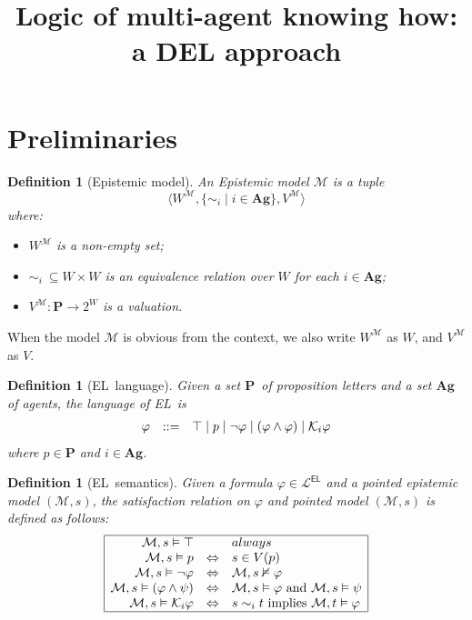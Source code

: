 \documentclass{article}
\title{Logic of multi-agent knowing how: a DEL approach}
\author{}
\date{}
\newtheorem{definition}[theorem]{Definition}
\newcommand{\EL}{\textsf{EL}}
\newcommand{\Act}{\ensuremath{\mathbf{A}}}
\newcommand{\Ag}{\ensuremath{\mathbf{Ag}}}
\newcommand{\BP}{\ensuremath{\mathbf{P}}}
\newcommand{\M}{\mathcal{M}}
\newcommand{\lr}[1]{\langle #1 \rangle}
\newcommand{\K}{\mathcal{K}}
\newcommand{\LanEL}{\ensuremath{\mathcal{L}^\EL}}
\newcommand{\LRA}{\Leftrightarrow}
\renewcommand{\phi}{\varphi}
\begin{document}
\maketitle

\section{Preliminaries}
\begin{definition}[Epistemic model]
	An Epistemic model $\M$ is a tuple $$\lr{W^\M,\{\sim_i\mid i\in \Ag \},V^\M}$$ where:
	\begin{itemize}
		\item $W^\M$ is a non-empty set;
		\item $\sim_i\ \subseteq {W\times W}$ is an equivalence relation over $W$ for each $i\in \Ag$;
		\item $V^\M:\BP\to 2^W$ is a valuation.
	\end{itemize}
\end{definition}
When the model $\M$ is obvious from the context, we also write $W^\M$ as $W$, and $V^\M$ as $V$.
\begin{definition}[\EL\ language]
	Given a set \BP\ of proposition letters and a set $\Ag$ of agents, the language of \EL\ is 
	$$\begin{array}{r@{\quad::= \quad}l}
	\varphi  &
	\top\mid p
	\mid \neg \varphi
	\mid (\varphi \land \varphi)
	\mid \K_i\phi \\
	\end{array}$$
	where $p\in\BP$ %
	and $i\in\Ag$. 
\end{definition}

\begin{definition}[\EL\ semantics]
	Given a formula $\phi\in\LanEL$ and a pointed epistemic model $(\M,s)$, %
	the satisfaction relation on $\phi$ and pointed model $(\M,s)$ is defined as follows:
	$$\begin{array}{|rll|}
	\hline
	\M,s\vDash \top &  & always\\
	\M,s\vDash p & \Leftrightarrow & s\in V(p)\\
	\M,s\vDash \neg\phi & \Leftrightarrow & \M,s\nvDash \phi\\
	\M,s\vDash (\phi\wedge\psi) &\LRA & \M,s\vDash\phi \text{ and } \M,s\vDash \psi\\
	\M,s\vDash \K_i\phi&\Leftrightarrow&s\sim_i t \text{ implies } \M,t\vDash\phi\\
	\hline 
	\end{array}$$
\end{definition}
\end{document}
